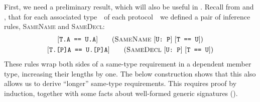 \documentclass[../generics]{subfiles}
\begin{document}
First, we need a preliminary result, which will also be useful in . Recall from  and , that for each associated type~\nA\ of each protocol~\tP\ we defined a pair of inference rules, \textsc{SameName} and \textsc{SameDecl}:
\begin{gather*}
\SameNameStepDef\\
\SameDeclStepDef
\end{gather*}
These rules wrap both sides of a same-type requirement in a dependent member type, increasing their lengths by one. The below construction shows that this also allows us to derive ``longer'' same-type requirements. This requires proof by induction, together with some facts about well-formed generic signatures ().
\end{document}
